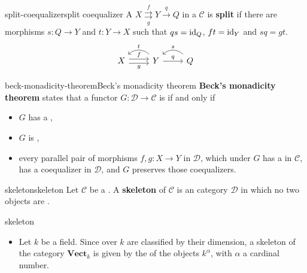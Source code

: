 \begin{topic}{split-coequalizer}{split coequalizer}
    A  $X \overset{f}{\underset{g}{\rightrightarrows}} Y \xrightarrow{q} Q$ in a  $\mathcal{C}$ is \textbf{split} if there are morphisms $s : Q \to Y$ and $t : Y \to X$ such that $qs = \text{id}_Q$, $ft = \text{id}_Y$ and $sq = gt$.
    \[ \begin{tikzcd} X \arrow[shift left=0.25em]{r}{f} \arrow[swap, shift right=0.25em]{r}{g} & Y \arrow{r}{q} \arrow[swap, bend right=45]{l}{t} & Q \arrow[swap, bend right=45]{l}{s} \end{tikzcd} \]
\end{topic}

\begin{topic}{beck-monadicity-theorem}{Beck's monadicity theorem}
    \textbf{Beck's monadicity theorem} states that a functor $G : \mathcal{D} \to \mathcal{C}$ is  if and only if
    \begin{itemize}
        \item $G$ has a ,
        \item $G$ is ,
        \item every parallel pair of morphisms $f, g : X \to Y$ in $\mathcal{D}$, which under $G$ has a  in $\mathcal{C}$, has a coequalizer in $\mathcal{D}$, and $G$ preserves those coequalizers.
    \end{itemize}
\end{topic}

\begin{topic}{skeleton}{skeleton}
    Let $\mathcal{C}$ be a . A \textbf{skeleton} of $\mathcal{C}$ is an  category $\mathcal{D}$ in which no two objects are . 
\end{topic}

\begin{example}{skeleton}
    \begin{itemize}
        \item Let $k$ be a field. Since  over $k$ are classified by their dimension, a skeleton of the category $\textbf{Vect}_k$ is given by the  of the objects $k^{\alpha}$, with $\alpha$ a cardinal number.
    \end{itemize}
\end{example}

